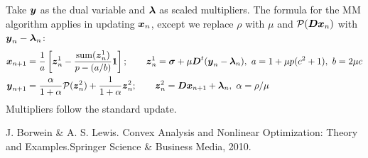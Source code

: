 \documentclass[11pt]{article}
\begin{document}
Take $\boldsymbol{y}$ as the dual variable and $\boldsymbol{\lambda}$ as scaled multipliers.
The formula for the MM algorithm applies in updating $\boldsymbol{x}_{n}$, except we replace $\rho$ with $\mu$ and $\mathcal{P}(\boldsymbol{D} \boldsymbol{x}_{n})$ with $\boldsymbol{y}_{n} - \boldsymbol{\lambda}_{n}$:
\begin{align*}
    \boldsymbol{x}_{n+1}
    &=
    \frac{1}{a}\left[
        \boldsymbol{z}^{1}_{n} - \frac{\mathrm{sum}(\boldsymbol{z}^{1}_{n})}{p - (a/b)} \boldsymbol{1}
    \right];
    \qquad
    \boldsymbol{z}_{n}^{1}
    =
    \boldsymbol{\sigma} + \mu \boldsymbol{D}^{t} (\boldsymbol{y}_{n} - \boldsymbol{\lambda}_{n}),
    ~a = 1 + \mu p (c^{2} + 1), ~b = 2 \mu c \\
    \boldsymbol{y}_{n+1}
    &= \frac{\alpha}{1+\alpha} \mathcal{P}(\boldsymbol{z}^{2}_{n}) + \frac{1}{1+\alpha} \boldsymbol{z}^{2}_{n};
    \qquad \boldsymbol{z}^{2}_{n} = \boldsymbol{D} \boldsymbol{x}_{n+1} + \boldsymbol{\lambda}_{n},~\alpha = \rho / \mu
    \end{align*}
Multipliers follow the standard update.

\begin{thebibliography}{99}
     J. Borwein \& A. S. Lewis. {Convex Analysis and Nonlinear Optimization: Theory and Examples}.Springer Science \& Business Media, 2010.    
\end{thebibliography}
\end{document}
